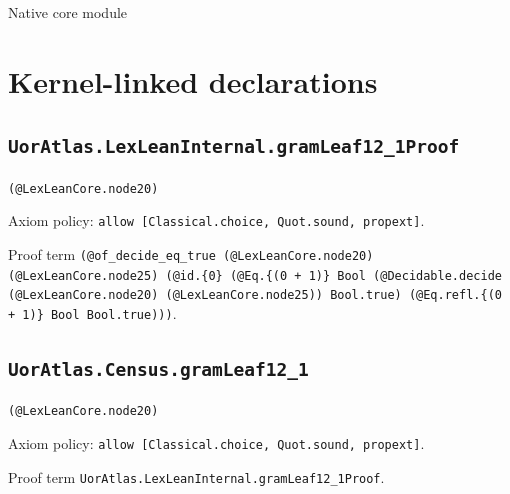 \documentclass[11pt]{article}
\begin{document}
\begin{center}{\LARGE Native core module}\end{center}
\section*{Kernel-linked declarations}
\subsection*{\texttt{UorAtlas.LexLeanInternal.gramLeaf12\_1Proof}}
\noindent\texttt{(@LexLeanCore.node20)}\par
\noindent Axiom policy: \texttt{allow [Classical.choice, Quot.sound, propext]}.\par
\noindent Proof term \texttt{(@of\_decide\_eq\_true (@LexLeanCore.node20) (@LexLeanCore.node25) (@id.\{0\} (@Eq.\{(0 + 1)\} Bool (@Decidable.decide (@LexLeanCore.node20) (@LexLeanCore.node25)) Bool.true) (@Eq.refl.\{(0 + 1)\} Bool Bool.true)))}.\par
\subsection*{\texttt{UorAtlas.Census.gramLeaf12\_1}}
\noindent\texttt{(@LexLeanCore.node20)}\par
\noindent Axiom policy: \texttt{allow [Classical.choice, Quot.sound, propext]}.\par
\noindent Proof term \texttt{UorAtlas.LexLeanInternal.gramLeaf12\_1Proof}.\par
\end{document}
